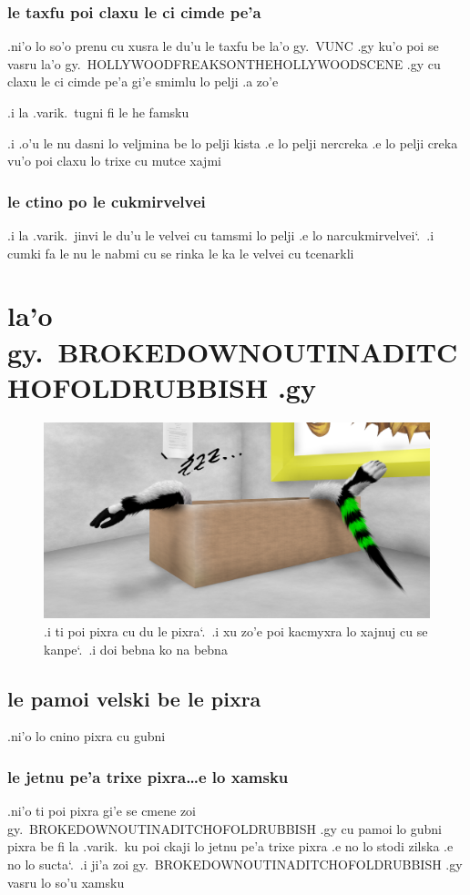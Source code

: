 \documentclass{report}
\newcommand\sds{\spacefactor\sfcode`.\ \space}
\begin{document}
\subsection{le taxfu poi claxu le ci cimde pe'a}
.ni'o lo so'o prenu cu xusra le du'u le taxfu be la'o gy.\ VUNC .gy ku'o poi se vasru la'o gy.\ HOLLYWOODFREAKSONTHEHOLLYWOODSCENE .gy cu claxu le ci cimde pe'a gi'e smimlu lo pelji .a zo'e

.i la .varik.\ tugni fi le he famsku

.i .o'u le nu dasni lo veljmina be lo pelji kista .e lo pelji nercreka .e lo pelji creka vu'o poi claxu lo trixe cu mutce xajmi

\subsection{le ctino po le cukmirvelvei}
.i la .varik.\ jinvi le du'u le velvei cu tamsmi lo pelji .e lo narcukmirvelvei\sds  .i cumki fa le nu le nabmi cu se rinka le ka le velvei cu tcenarkli

\chapter{la'o gy.\ BROKEDOWNOUTINADITCHOFOLDRUBBISH .gy}
\begin{figure}[ht]
	\centering
	\includegraphics[width=\textwidth]{brokedownoutinaditchofoldrubbish/brokedownoutinaditchofoldrubbish.png}
	\caption[center]{.i ti poi pixra cu du le pixra\sds  .i xu zo'e poi kacmyxra lo xajnuj cu se kanpe\sds  .i doi bebna ko na bebna}
\end{figure}
\section{le pamoi velski be le pixra}
.ni'o lo cnino pixra cu gubni

\subsection{le jetnu pe'a trixe pixra\ldots e lo xamsku}
.ni'o ti poi pixra gi'e se cmene zoi gy.\ BROKEDOWNOUTINADITCHOFOLDRUBBISH .gy cu pamoi lo gubni pixra be fi la .varik.\ ku poi ckaji lo jetnu pe'a trixe pixra .e no lo stodi zilska .e no lo sucta\sds  .i ji'a zoi gy.\ BROKEDOWNOUTINADITCHOFOLDRUBBISH .gy vasru lo so'u xamsku
\end{document}
